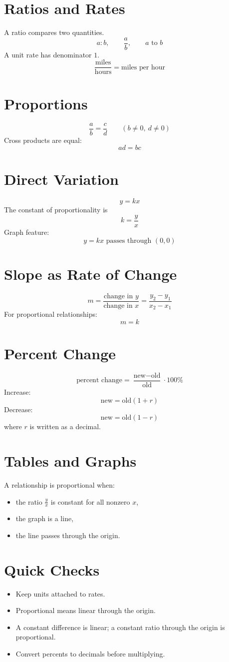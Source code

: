 \documentclass[11pt]{article}
\begin{document}

\section*{Ratios and Rates}
A ratio compares two quantities.
\[
a:b,\qquad \frac{a}{b},\qquad a\text{ to }b
\]
A unit rate has denominator $1$.
\[
\frac{\text{miles}}{\text{hours}}=\text{miles per hour}
\]

\section*{Proportions}
\[
\frac{a}{b}=\frac{c}{d}\qquad (b\ne0,\ d\ne0)
\]
Cross products are equal:
\[
ad=bc
\]

\section*{Direct Variation}
\[
y=kx
\]
The constant of proportionality is
\[
k=\frac{y}{x}
\]
Graph feature:
\[
y=kx\text{ passes through }(0,0)
\]

\section*{Slope as Rate of Change}
\[
m=\frac{\text{change in }y}{\text{change in }x}
=\frac{y_2-y_1}{x_2-x_1}
\]
For proportional relationships:
\[
m=k
\]

\section*{Percent Change}
\[
\text{percent change}=\frac{\text{new}-\text{old}}{\text{old}}\cdot100\%
\]
Increase:
\[
\text{new}=\text{old}(1+r)
\]
Decrease:
\[
\text{new}=\text{old}(1-r)
\]
where $r$ is written as a decimal.

\section*{Tables and Graphs}
A relationship is proportional when:
\begin{itemize}
  \item the ratio $\frac{y}{x}$ is constant for all nonzero $x$,
  \item the graph is a line,
  \item the line passes through the origin.
\end{itemize}

\section*{Quick Checks}
\begin{itemize}
  \item Keep units attached to rates.
  \item Proportional means linear through the origin.
  \item A constant difference is linear; a constant ratio through the origin is proportional.
  \item Convert percents to decimals before multiplying.
\end{itemize}
\end{document}
